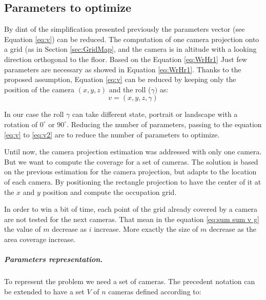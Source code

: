 \subsection{Parameters to optimize }\label{sec:parameterToOptimize}
By dint of the simplification presented previously the parameters vector (see Equation \ref{eq:v}) can be reduced.
The computation of one camera projection onto a grid (as in Section \ref{sec:GridMap}, and the camera is in altitude with a looking direction orthogonal to the floor. Based on the Equation \ref{eq:WrHr1}
Just few parameters are necessary as showed in Equation \ref{eq:WrHr1}. Thanks to the proposed assumption,  Equation \ref{eq:v} can be reduced by keeping only the position of the camera $(x,y,z)$ and the roll ($\gamma)$ as:
	\begin{equation}\label{eq:v2}
		v=(x,y,z,\gamma ) 
	\end{equation}

In our case the roll $\gamma$ can take different state, portrait or landscape with a rotation of $0^\circ$ or $90^\circ$.
Reducing the number of  parameters, passing to the equation \ref{eq:v} to \ref{eq:v2} are to reduce the number of parameters to optimize. 


Until now, the camera projection estimation was addressed with only one camera. But we want to compute the coverage for a set of cameras. 
The solution is based on the previous estimation for the camera projection, but adapts to the location of each camera. By positioning the rectangle projection to have the center of it at the $x$ and $y$ position and compute the occupation grid.

In order to win a bit of time, each point of the grid already covered by a camera are not tested for the next cameras. %
That mean in the equation \ref{eq:sum sum v g} the value of $m$ decrease as $i$ increase. More exactly the size of $m$ decrease as the area coverage increase.  


\subparagraph{Parameters representation. \\}

To represent the problem we need a set of cameras. The precedent notation can be extended to have a set $V$ of $n$ cameras defined according to:

